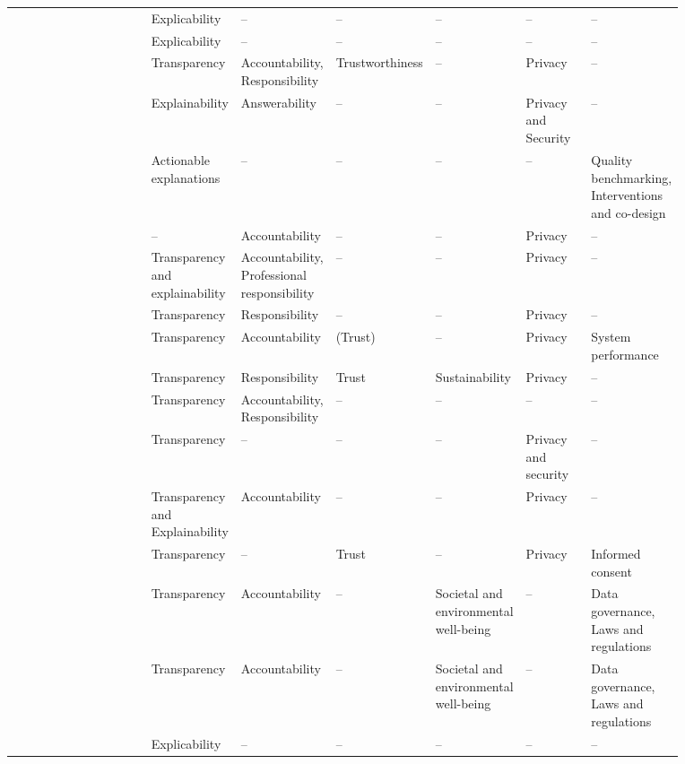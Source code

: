 \begin{landscape}
\begin{ThreePartTable}
\begin{longtable}{P{0.25\linewidth}P{0.12\linewidth}P{0.12\linewidth}P{0.08\linewidth}P{0.1\linewidth}P{0.1\linewidth}P{0.1\linewidth}}
        \textcite{Floridi_2018} & Explicability & -- & -- & -- & -- & -- \\ 
        \textcite{Floridi_2019} & Explicability & -- & -- & -- & -- & -- \\ 
        \textcite{Gianni_2022} & Transparency & Accountability, \mbox{Responsibility} & Trust\-worthiness & -- & Privacy & -- \\ 
        \textcite{Gupta_2021} & Explainability & Answerability & -- & -- & Privacy and \mbox{Security} & -- \\ 
        \textcite{Hacker_2022} & Actionable \mbox{explanations} & -- & -- & -- & -- & Quality benchmarking, \mbox{Interventions} and co-design \\ 
        \textcite{Hagendorff_2020} & -- & Accountability & -- & -- & Privacy & -- \\ 
        \textcite{Havrda_2020} & Transparency and explainability & Accountability, \mbox{Professional} \mbox{responsibility} & -- & -- & Privacy & -- \\ 
        \textcite{Henriksen_2021} & Transparency & Responsibility & -- & -- & Privacy & -- \\ 
        \textcite{Jakesch_2022} & Transparency & Accountability & (Trust)\tnote{*} & -- & Privacy & System \mbox{performance} \\ 
        \textcite{Jobin_2019} & Transparency & Responsibility & Trust & Sustainability & Privacy & -- \\ 
        \textcite{Kumar_2021} & Transparency & Accountability, \mbox{Responsibility} & -- & -- & -- & -- \\ 
        \textcite{Liu_2021} & Transparency & -- & -- & -- & Privacy and \mbox{security} & -- \\ 
        \textcite{Lu_2022} & Transparency and Explainability & Accountability & -- & -- & Privacy & -- \\ 
        \textcite{Lukkien_2021} & Transparency & -- & Trust & -- & Privacy & Informed consent \\ 
        \textcite{Merhi_2022} & Transparency & Accountability & -- & Societal and \mbox{environmental} well-being & -- & Data \mbox{governance}, Laws and \mbox{regulations} \\ 
        \textcite{Mikalef_2022} & Transparency & Accountability & -- & Societal and \mbox{environmental} well-being & -- & Data \mbox{governance}, Laws and \mbox{regulations} \\ 
        \textcite{Morley_2020} & Explicability & -- & -- & -- & -- & -- \\ 

\end{longtable}
\end{ThreePartTable}
\end{landscape}
